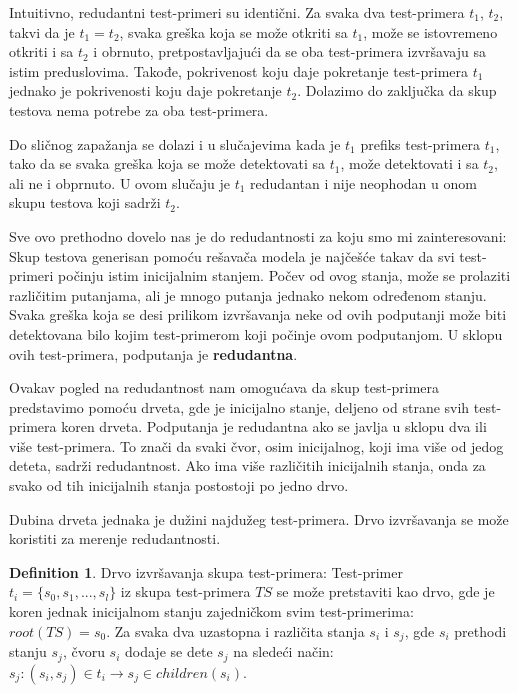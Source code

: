 \documentclass[a4paper]{article}
\theoremstyle{definition}
\newtheorem{definition}{Definition}[section]
\begin{document}
Intuitivno, redudantni test-primeri su identični. Za svaka dva test-primera $t_1$, $t_2$, takvi da je $ t_1 = t_2$, svaka greška koja se može otkriti sa $t_1$, može se istovremeno otkriti i sa $t_2$ i obrnuto, pretpostavljajući da se oba test-primera izvršavaju sa istim preduslovima. Takođe, pokrivenost koju daje pokretanje test-primera $t_1$ jednako je pokrivenosti koju daje pokretanje $t_2$. Dolazimo do zaključka da skup testova nema potrebe za oba test-primera.

Do sličnog zapažanja se dolazi i u slučajevima kada je $t_1$ prefiks test-primera $t_1$, tako da se svaka greška koja se može detektovati sa $t_1$, može detektovati i sa $t_2$, ali ne i obprnuto. U ovom slučaju je $t_1$ redudantan i nije neophodan u onom skupu testova koji sadrži $t_2$.

Sve ovo prethodno dovelo nas je do redudantnosti za koju smo mi zainteresovani: Skup testova generisan pomoću rešavača modela je najčešće takav da svi test-primeri počinju istim inicijalnim stanjem. Počev od ovog stanja, može se prolaziti različitim putanjama, ali je mnogo putanja jednako nekom određenom stanju. Svaka greška koja se desi prilikom izvršavanja neke od ovih podputanji može biti detektovana bilo kojim test-primerom koji počinje ovom podputanjom. U sklopu ovih test-primera, podputanja je \textbf{redudantna}.

Ovakav pogled na redudantnost nam omogućava da skup test-primera predstavimo pomoću drveta, gde je inicijalno stanje, deljeno od strane svih test-primera koren drveta. Podputanja je redudantna ako se javlja u sklopu dva ili više test-primera. To znači da svaki čvor, osim inicijalnog, koji ima više od jedog deteta, sadrži redudantnost. Ako ima više različitih inicijalnih stanja, onda za svako od tih inicijalnih stanja postostoji po jedno drvo.

Dubina drveta jednaka je dužini najdužeg test-primera. Drvo izvršavanja se može koristiti za merenje redudantnosti.

\begin{definition}{Drvo izvršavanja skupa test-primera:}
Test-primer $t_i = \{s_0, s_1, ..., s_l\}$ iz skupa test-primera $TS$ se može pretstaviti kao drvo, gde je koren jednak inicijalnom stanju zajedničkom svim test-primerima: $root(TS) = s_0$. Za svaka dva uzastopna i različita stanja $s_i$ i $s_j$, gde $s_i$ prethodi stanju $s_j$, čvoru $s_i$ dodaje se dete $s_j$ na sledeći način: $s_j: (s_i, s_j) \in t_i \rightarrow s_j \in children(s_i)$.
\end{definition}
\end{document}
